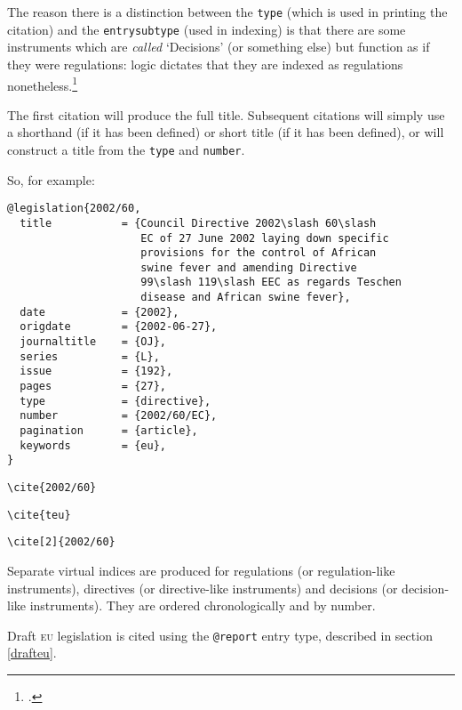 \documentclass[a5paper,fontsize=9pt,DIV=1]{scrartcl}
\newcounter{egcounter}\setcounter{egcounter}{0}
\newenvironment{bibexample}[1][]{%
  \medskip\par\small\noindent\ignorespaces
  \marginpar{[\refstepcounter{egcounter}\arabic{egcounter}]\label{#1}}
  \begin{minipage}[t]{0.95\linewidth}}
 {\end{minipage}\par\medskip}
\newcommand{\egcite}[1]{\texttt{\textbackslash cite#1}}
\begin{document}
The reason there is a distinction between the \texttt{type} (which is used in
printing the citation) and the \texttt{entrysubtype} (used in indexing) is that
there are some instruments which are \emph{called} `Decisions' (or
something else) but function as if they were regulations: logic
dictates that they are indexed as regulations
nonetheless.\footcite[The curious can consult][763 n 502]{lenaerts2}

The first citation will produce the full title. Subsequent citations
will simply use a shorthand (if it has been defined) or short title
(if it has been defined), or will construct a title from the
\texttt{type} and \texttt{number}.

So, for example:
\begin{bibexample}[2002/60]
\begin{verbatim}
@legislation{2002/60,
  title           = {Council Directive 2002\slash 60\slash 
                     EC of 27 June 2002 laying down specific 
                     provisions for the control of African 
                     swine fever and amending Directive  
                     99\slash 119\slash EEC as regards Teschen  
                     disease and African swine fever},
  date            = {2002},
  origdate        = {2002-06-27},
  journaltitle    = {OJ},
  series          = {L},
  issue           = {192},
  pages           = {27},
  type            = {directive},
  number          = {2002/60/EC},
  pagination      = {article},
  keywords        = {eu},
}
\end{verbatim}
\end{bibexample}

{\sloppy
\begin{description}
\item[\egcite{\{2002/60\}}] \cite{2002/60}
\item[\egcite{\{teu\}}] \cite{teu}
\item[\egcite{[2]\{2002/60\}}] \cite[2]{2002/60}
\end{description}}

Separate virtual indices are produced for regulations (or
regulation-like instruments), directives (or directive-like
instruments) and decisions (or decision-like instruments). They are
ordered chronologically and by number.

Draft \textsc{eu} legislation is cited using the \texttt{@report}
entry type, described in section \ref{drafteu}.
\end{document}
